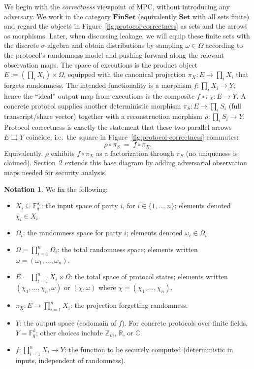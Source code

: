 \documentclass[11pt,a4paper]{article}
\theoremstyle{definition}
\newtheorem{notation}[definition]{Notation}
\theoremstyle{plain}
\newcommand{\R}{\mathbb{R}}
\newcommand{\Z}{\mathbb{Z}}
\newcommand{\F}{\mathbb{F}}
\begin{document}
We begin with the \emph{correctness} viewpoint of MPC, without introducing any adversary. We work in the category $\mathbf{FinSet}$ (equivalently $\mathbf{Set}$ with all sets finite) and regard the objects in Figure~\ref{fig:protocol-correctness} as sets and the arrows as morphisms. Later, when discussing leakage, we will equip these finite sets with the discrete $\sigma$-algebra and obtain distributions by sampling $\omega\in\Omega$ according to the protocol's randomness model and pushing forward along the relevant observation maps. The space of executions is the product object $E := (\prod_i X_i)\times \Omega$, equipped with the canonical projection $\pi_X:E\to \prod_i X_i$ that forgets randomness. The intended functionality is a morphism $f:\prod_i X_i\to Y$; hence the ``ideal'' output map from executions is the composite $f\circ \pi_X:E\to Y$. A concrete protocol supplies another deterministic morphism $\pi_S:E\to \prod_i S_i$ (full transcript/share vector) together with a reconstruction morphism $\rho:\prod_i S_i\to Y$. Protocol correctness is exactly the statement that these two parallel arrows $E\rightrightarrows Y$ coincide, i.e.\ the square in Figure~\ref{fig:protocol-correctness} commutes:
\[
\rho\circ \pi_S \;=\; f\circ \pi_X.
\]
Equivalently, $\rho$ exhibits $f\circ \pi_X$ as a factorization through $\pi_S$ (no uniqueness is claimed). Section~2 extends this base diagram by adding adversarial observation maps needed for security analysis.

\begin{notation}
We fix the following:
\begin{itemize}
    \item $X_i \subseteq \F_q^{d_i}$: the input space of party $i$, for $i \in \{1, \ldots, n\}$; elements denoted $\chi_i \in X_i$.
    \item $\Omega_i$: the randomness space for party $i$; elements denoted $\omega_i \in \Omega_i$.
    \item $\Omega = \prod_{i=1}^n \Omega_i$: the total randomness space; elements written $\omega = (\omega_1, \ldots, \omega_n)$.
    \item $E = \prod_{i=1}^n X_i \times \Omega$: the total space of protocol states; elements written $(\chi_1, \ldots, \chi_n, \omega)$ or $(\chi, \omega)$ where $\chi = (\chi_1, \ldots, \chi_n)$.
    \item $\pi_X: E \to \prod_{i=1}^n X_i$: the projection forgetting randomness.
    \item $Y$: the output space (codomain of $f$). For concrete protocols over finite fields, $Y = \F_q^k$; other choices include $\Z_m$, $\R$, or $\mathbb{C}$.
    \item $f: \prod_{i=1}^n X_i \to Y$: the function to be securely computed (deterministic in inputs, independent of randomness).
\end{itemize}
\end{notation}
\end{document}

